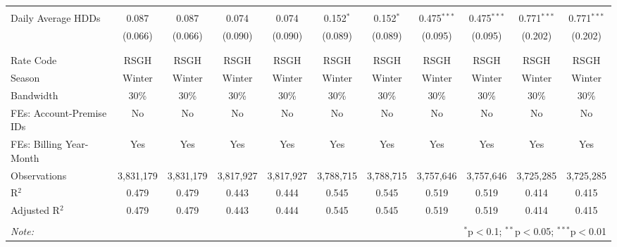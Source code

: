 \begin{table}[!htbp]
\begin{tabular}{@{\extracolsep{5pt}}lcccccccccc}
  & & & & & & & & & & \\ 
 Daily Average HDDs & 0.087 & 0.087 & 0.074 & 0.074 & 0.152$^{*}$ & 0.152$^{*}$ & 0.475$^{***}$ & 0.475$^{***}$ & 0.771$^{***}$ & 0.771$^{***}$ \\ 
  & (0.066) & (0.066) & (0.090) & (0.090) & (0.089) & (0.089) & (0.095) & (0.095) & (0.202) & (0.202) \\ 
  & & & & & & & & & & \\ 
\hline \\[-1.8ex] 
Rate Code & RSGH & RSGH & RSGH & RSGH & RSGH & RSGH & RSGH & RSGH & RSGH & RSGH \\ 
Season & Winter & Winter & Winter & Winter & Winter & Winter & Winter & Winter & Winter & Winter \\ 
Bandwidth & 30\% & 30\% & 30\% & 30\% & 30\% & 30\% & 30\% & 30\% & 30\% & 30\% \\ 
FEs: Account-Premise IDs & No & No & No & No & No & No & No & No & No & No \\ 
FEs: Billing Year-Month & Yes & Yes & Yes & Yes & Yes & Yes & Yes & Yes & Yes & Yes \\ 
Observations & 3,831,179 & 3,831,179 & 3,817,927 & 3,817,927 & 3,788,715 & 3,788,715 & 3,757,646 & 3,757,646 & 3,725,285 & 3,725,285 \\ 
R$^{2}$ & 0.479 & 0.479 & 0.443 & 0.444 & 0.545 & 0.545 & 0.519 & 0.519 & 0.414 & 0.415 \\ 
Adjusted R$^{2}$ & 0.479 & 0.479 & 0.443 & 0.444 & 0.545 & 0.545 & 0.519 & 0.519 & 0.414 & 0.415 \\ 
\hline 
\hline \\[-1.8ex] 
\textit{Note:}  & \multicolumn{10}{r}{$^{*}$p$<$0.1; $^{**}$p$<$0.05; $^{***}$p$<$0.01} \\ 
\end{tabular} 
\end{table} 

